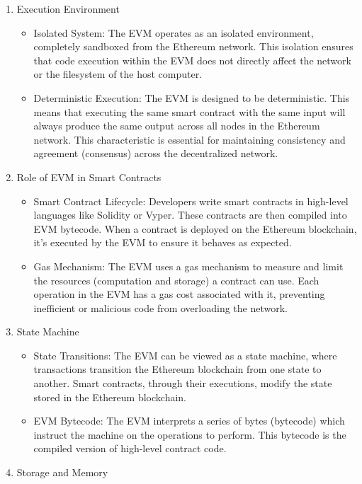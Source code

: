 \begin{enumerate}
    \item  Execution Environment
          \begin{itemize}
              \item Isolated System: The EVM operates as an isolated environment, completely sandboxed from the Ethereum network. This isolation ensures that code execution within the EVM does not directly affect the network or the filesystem of the host computer.
              \item Deterministic Execution: The EVM is designed to be deterministic. This means that executing the same smart contract with the same input will always produce the same output across all nodes in the Ethereum network. This characteristic is essential for maintaining consistency and agreement (consensus) across the decentralized network.
          \end{itemize}
    \item Role of EVM in Smart Contracts
          \begin{itemize}
              \item Smart Contract Lifecycle: Developers write smart contracts in high-level languages like Solidity or Vyper. These contracts are then compiled into EVM bytecode. When a contract is deployed on the Ethereum blockchain, it's executed by the EVM to ensure it behaves as expected.
              \item           Gas Mechanism: The EVM uses a gas mechanism to measure and limit the resources (computation and storage) a contract can use. Each operation in the EVM has a gas cost associated with it, preventing inefficient or malicious code from overloading the network.
          \end{itemize}
    \item State Machine
          \begin{itemize}
              \item           State Transitions: The EVM can be viewed as a state machine, where transactions transition the Ethereum blockchain from one state to another. Smart contracts, through their executions, modify the state stored in the Ethereum blockchain.
              \item           EVM Bytecode: The EVM interprets a series of bytes (bytecode) which instruct the machine on the operations to perform. This bytecode is the compiled version of high-level contract code.
          \end{itemize}
    \item Storage and Memory

\end{enumerate}
